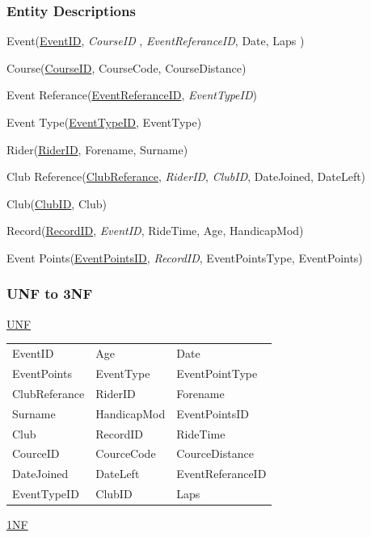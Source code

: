 \subsubsection{Entity Descriptions}

Event(\underline{EventID}, \emph{CourseID} , \emph{EventReferanceID}, Date, Laps )

Course(\underline{CourseID}, CourseCode, CourseDistance)

Event Referance(\underline{EventReferanceID}, \emph{EventTypeID})

Event Type(\underline{EventTypeID}, EventType)

Rider(\underline{RiderID}, Forename, Surname)

Club Reference(\underline{ClubReferance}, \emph{RiderID}, \emph{ClubID}, DateJoined, DateLeft)

Club(\underline{ClubID}, Club)

Record(\underline{RecordID}, \emph{EventID}, RideTime, Age, HandicapMod)

Event Points(\underline{EventPointsID}, \emph{RecordID}, EventPointsType, EventPoints)

\subsubsection{UNF to 3NF}
\underline{UNF}


\begin{tabular}{l l l}
EventID        & Age              & Date               \\
EventPoints    & EventType        & EventPointType     \\
ClubReferance  & RiderID          & Forename           \\
Surname        & HandicapMod      & EventPointsID      \\
Club           & RecordID         & RideTime           \\
CourceID       & CourceCode       & CourceDistance     \\
DateJoined     & DateLeft         & EventReferanceID   \\
EventTypeID    & ClubID           & Laps               \\

\end{tabular}

\underline{1NF}

